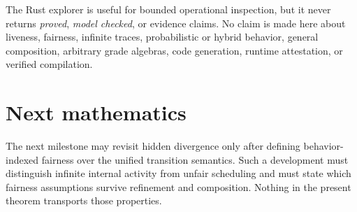 \documentclass[11pt]{article}
\begin{document}
The Rust explorer is useful for bounded operational inspection, but it never
returns \emph{proved}, \emph{model checked}, or evidence claims.  No claim is
made here about liveness, fairness, infinite traces, probabilistic or hybrid
behavior, general composition, arbitrary grade algebras, code generation,
runtime attestation, or verified compilation.

\section{Next mathematics}

The next milestone may revisit hidden divergence only after defining
behavior-indexed fairness over the unified transition semantics.  Such a
development must distinguish infinite internal activity from unfair
scheduling and must state which fairness assumptions survive refinement and
composition.  Nothing in the present theorem transports those properties.
\end{document}
